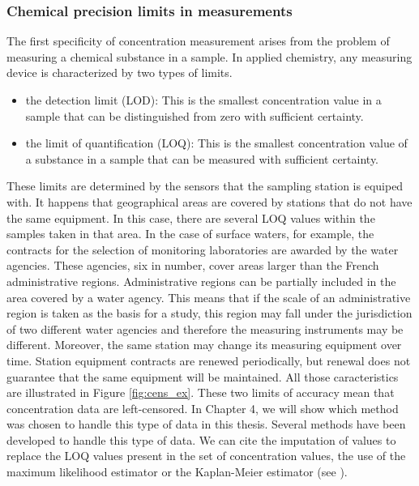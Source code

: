 \subsubsection{Chemical precision limits in measurements}

The first specificity of concentration measurement arises from the problem of measuring a chemical substance in a sample. In applied chemistry, any measuring device is characterized by two types of limits. 

\begin{itemize}
    \item the detection limit (LOD): This is the smallest concentration value in a sample that can be distinguished from zero with sufficient certainty.
    \item the limit of quantification (LOQ): This is the smallest concentration value of a substance in a sample that can be measured with  sufficient certainty. 
\end{itemize}

These limits are determined by the sensors that the sampling station is equiped with. It happens that geographical areas are covered by stations that do not have the same equipment. In this case, there are several LOQ values within the samples taken in that area. In the case of surface waters, for example, the contracts for the selection of monitoring laboratories are awarded by the water agencies. These agencies, six in number, cover areas larger than the French administrative regions. Administrative regions can be partially included in the area covered by a water agency. This means that if the scale of an administrative region is taken as the basis for a study, this region may fall under the jurisdiction of two different water agencies and therefore the measuring instruments may be different. Moreover, the same station may change its measuring equipment over time. Station equipment contracts are renewed periodically, but renewal does not guarantee that the same equipment will be maintained. All those caracteristics are illustrated in Figure \ref{fig:cens_ex}. These two limits of accuracy mean that concentration data are left-censored. In Chapter 4, we will show which method was chosen to handle this type of data in this thesis. Several methods have been developed to handle this type of data. We can cite the imputation of values to replace the LOQ values present in the set of concentration values, the use of the maximum likelihood estimator or the Kaplan-Meier estimator (see \cite{Gillaizeau2020,Croghan2003MethodsOD}). 

